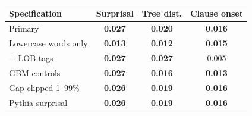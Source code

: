 \setlength{\tabcolsep}{3pt}\begin{tabular}{@{}lccc@{}}
\toprule
Specification & Surprisal & Tree dist. & Clause onset \\
\midrule
Primary & \textbf{0.027} & \textbf{0.020} & \textbf{0.016} \\
Lowercase words only & \textbf{0.013} & \textbf{0.012} & \textbf{0.015} \\
+ LOB tags & \textbf{0.027} & \textbf{0.027} & {0.005} \\
GBM controls & \textbf{0.027} & \textbf{0.016} & \textbf{0.013} \\
Gap clipped 1--99\% & \textbf{0.026} & \textbf{0.019} & \textbf{0.016} \\
Pythia surprisal & \textbf{0.026} & \textbf{0.019} & \textbf{0.016} \\
\bottomrule
\end{tabular}
